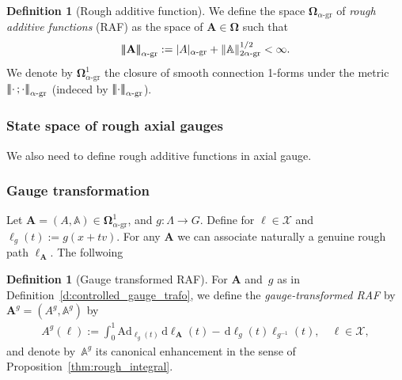 \documentclass[12pt]{article}
\numberwithin{equation}{section}
\theoremstyle{definition}
\newtheorem{definition}[theorem]{Definition}
\theoremstyle{remark}
\newcommand{\Ad}{\mathrm{Ad}}
\newcommand{\dif}{\,\mathrm{d}}
\newcommand{\1}{\mathbf 1}
\newcommand{\<}{\langle}
\renewcommand{\>}{\rangle}
\newcommand{\gr}{\text{-}\mathrm{gr}}
\newcommand{\green}[1]{\textcolor{darkgreen}{#1}}
\newcommand{\bfA}{\mathbf A}
\newcommand{\bA}{\mathbb A}
\newcommand{\bfOmega}{\boldsymbol{\Omega}}
\newcommand{\cX}{\mathcal X}
\newcommand{\vertiii}[1]{{\left\vert\kern-0.4ex\left\vert\kern-0.4ex\left\vert #1 
    \right\vert\kern-0.4ex\right\vert\kern-0.4ex\right\vert}}
\newcommand{\triple}[1]{\vertiii{#1}}
\begin{document}
\begin{definition}[Rough additive function]
	We define the space $\bfOmega_{\alpha\gr}$ of \emph{rough additive functions} (RAF) as the space of $\bfA\in\bfOmega$ such that 
	\begin{align}\triple{\bfA}_{\alpha\gr}:=|A|_{\alpha\gr}+\|\bA\|_{2\alpha\gr}^{1/2}<\infty.\end{align} 
	We denote by $\bfOmega^1_{\alpha\gr}$ the closure of smooth connection 1-forms under the metric $\triple{\cdot\,;\cdot}_{\alpha\gr}$ (indeced by $\triple{\cdot}_{\alpha\gr}$). 
\end{definition}




\subsubsection{State space of rough axial gauges}
We also need to define rough additive functions in axial gauge. 




\subsubsection{Gauge transformation}\label{sec:gauge_transformation}
Let $\bfA=(A,\bA)\in \bfOmega^1_{\alpha\gr}$, and $g:\Lambda\to G$. Define for $\ell\in\cX$ and $\ell_g(t):=g(x+tv)$. For any $\bfA$ we can associate naturally a genuine rough path $\ell_\bfA$. The follwoing
\begin{definition}[Gauge transformed RAF]
	For $\bfA$ and~$g$ as in Definition~\ref{d:controlled_gauge_trafo}, we define the \emph{gauge-transformed RAF} by~$\bfA^g = (A^g,\bA^g)$ by
	\begin{align}\label{e:gauge_trafo_connection:2}
		A^g(\ell):=\int^1_0 \Ad_{\ell_g(t)}\dif\ell_{\bfA}(t)-\dif\ell_g(t)\ell_{g^{-1}}(t), \quad \ell \in \cX,
	\end{align}
	and denote by~$\bA^g$ its canonical enhancement in the sense of Proposition~\ref{thm:rough_integral}.
\end{definition}
\end{document}
